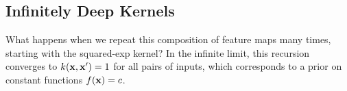 \subsection{Infinitely Deep Kernels}
What happens when we repeat this composition of feature maps many times, starting with the squared-exp kernel?  In the infinite limit, this recursion converges to $k({\bf{x}},{\bf{x}}') = 1$ for all pairs of inputs, which corresponds to a prior on constant functions $f({\bf{x}}) = c$.

%


